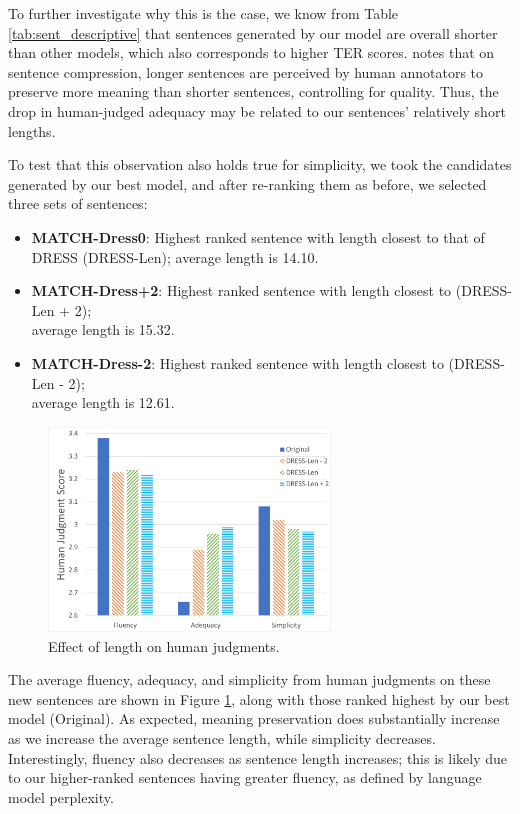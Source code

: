 \documentclass[thesis.tex]{subfiles}
\begin{document}
To further investigate why this is the case, we know from Table \ref{tab:sent_descriptive} that sentences generated by our model are overall shorter than other models, which also corresponds to higher TER scores. \cite{napoles2011evaluating} notes that on sentence compression, longer sentences are perceived by human annotators to preserve more meaning than shorter sentences, controlling for quality. Thus, the drop in human-judged adequacy may be related to our sentences' relatively short lengths.

To test that this observation also holds true for simplicity, we took the candidates generated by our best model, and after re-ranking them as before, we selected three sets of sentences:

\begin{itemize}
    \item \textbf{MATCH-Dress0}: Highest ranked sentence with length closest to that of DRESS (DRESS-Len); average length is 14.10.
    \item \textbf{MATCH-Dress+2}: Highest ranked sentence with length closest to (DRESS-Len + 2); \\ average length is 15.32.
    \item \textbf{MATCH-Dress-2}: Highest ranked sentence with length closest to (DRESS-Len - 2); \\ average length is 12.61.\\
\end{itemize}

\begin{figure}[bt]
    \centering
\includegraphics[width=7.5cm]{pictures/graph3.png}
\caption{Effect of length on human judgments.}
\label{length}
\end{figure}

The average fluency, adequacy, and simplicity from human judgments on these new sentences are shown in Figure \ref{length}, along with those ranked highest by our best model (Original). As expected, meaning preservation does substantially increase as we increase the average sentence length, while simplicity decreases. Interestingly, fluency also decreases as sentence length increases; this is likely due to our higher-ranked sentences having greater fluency, as defined by language model perplexity.
\end{document}
